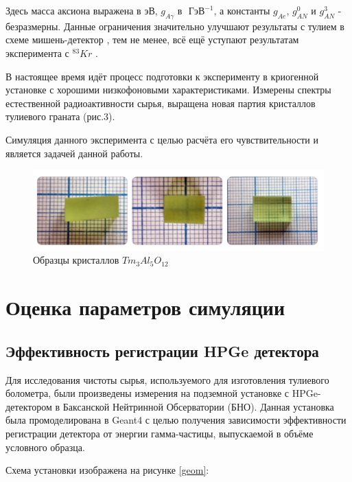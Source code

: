 \documentclass[a4paper,article,14pt]{extarticle}
\begin{document}
Здесь масса аксиона выражена в эВ, $g_{A\gamma }$ в $\text{ ГэВ}^{-1}$, а константы $g_{Ae }$, $g_{AN}^0$ и  $g_{AN}^3$ - безразмерны. Данные ограничения значительно улучшают результаты с тулием в схеме мишень-детектор \cite{Derbin2009}, тем не менее, всё ещё уступают результатам эксперимента с $^{83}Kr$ \cite{Derbin_2017_Kr}.

В настоящее время идёт процесс подготовки к эксперименту в криогенной установке с хорошими низкофоновыми характеристиками. Измерены спектры естественной радиоактивности сырья, выращена новая партия кристаллов тулиевого граната (рис.3). 

Симуляция данного эксперимента с целью расчёта его чувствительности и является задачей данной работы.





\begin{figure}[h]
    \centering
    \includegraphics[width = 0.75 \textwidth]{images/Crystals.png}
    \caption{Образцы кристаллов $Tm_3Al_5O_{12}$}
    \label{crystals}
\end{figure}


\newpage 

\section{Оценка параметров симуляции}
\subsection{Эффективность регистрации HPGe детектора}

Для исследования чистоты сырья, используемого для изготовления тулиевого болометра, были произведены измерения на подземной установке с HPGe-детектором в Баксанской Нейтринной Обсерватории (БНО). Данная установка была промоделирована в Geant4 с целью получения зависимости эффективности регистрации детектора от энергии гамма-частицы, выпускаемой в объёме условного образца.

Схема установки изображена на рисунке \ref{geom}:
\end{document}
